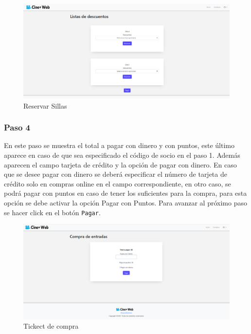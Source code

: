 \begin{figure}[h!]
	\centering
	\includegraphics[scale=0.35]{./chapters/img/reserve.png}
	
	\label{fig:reserve}
	\caption{Reservar Sillas}
\end{figure}

\subsubsection{Paso 4}
En este paso se muestra el total a pagar con dinero y con puntos, este \'ultimo aparece en caso de que sea especificado el c\'odigo de socio en el paso 1. Adem\'as aparecen el campo tarjeta de cr\'edito y la opci\'on de pagar con dinero. En caso que se desee pagar con dinero se deber\'a especificar el n\'umero de tarjeta de cr\'edito solo en compras online en el campo correspondiente, en otro caso, se podr\'a pagar con puntos en caso de tener los suficientes para la compra, para esta opci\'on se debe activar la opci\'on  Pagar con Puntos. Para avanzar al pr\'oximo paso se hacer click en el bot\'on \verb*|Pagar|.

\begin{figure}[h!]
	\centering
	\includegraphics[scale=0.35]{./chapters/img/ticketpurchase2.png}
	
	\label{fig:ticketpurchase2}
	\caption{Tickect de compra}
	
\end{figure}


